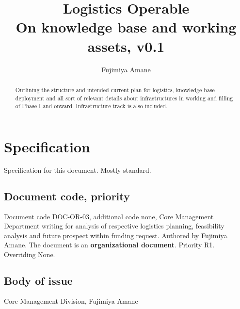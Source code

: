 \documentclass[10pt,a4paper]{article}
\title{\textbf{Logistics Operable} \\ On knowledge base and working assets, v0.1} %
\author{Fujimiya Amane} %
\affiliation{} %
\begin{document}
\maketitle

\begin{abstract}
    \noindent
    Outlining the structure and intended current plan for logistics, knowledge base deployment and all sort of relevant details about infrastructures in working and filling of Phase I and onward. Infrastructure track is also included.

\end{abstract}

\vspace{2.5cm}



\thispagestyle{firstpage}

\pagebreak


\newgeometry{} %

\section{Specification}
\label{sec:spec}

Specification for this document. Mostly standard. 
\subsection{Document code, priority}


Document code DOC-OR-03, additional code none, Core Management Department writing for analysis of respective logistics planning, feasibility analysis and future prospect within funding request. Authored by Fujimiya Amane. The document is an \textbf{organizational document}. Priority R1. Overriding None. 

\subsection{Body of issue}

Core Management Division, Fujimiya Amane 
\end{document}
